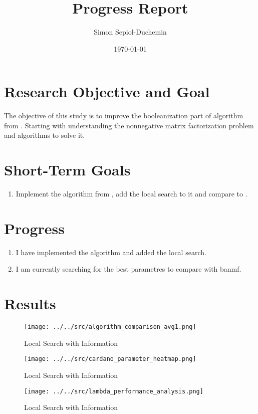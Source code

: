 \documentclass[a4paper,11pt]{article}
\title{Progress Report}
\author{Simon Sepiol-Duchemin}
\date{\today}
\begin{document}
%
\maketitle
\thispagestyle{empty}
%
\section{Research Objective and Goal}
The objective of this study is to improve the booleanization part of algorithm from \cite{9521203}. Starting with understanding the nonnegative matrix factorization problem and algorithms to solve it.
\section{Short-Term Goals}
\begin{enumerate}
\item Implement the algorithm from \cite{10541718}, add the local search to it and compare to \cite{9521203}.
\end{enumerate}
\section{Progress}
\begin{enumerate}
    \item I have implemented the algorithm and added the local search. 
    \item I am currently searching for the best parametres to compare with banmf.
\end{enumerate}

\section{Results}

\begin{figure}[H]
    \centering
    \texttt{[image: ../../src/algorithm\_comparison\_avg1.png]}
    \caption{Local Search with Information}
\end{figure}

\begin{figure}[H]
    \centering
    \texttt{[image: ../../src/cardano\_parameter\_heatmap.png]}
    \caption{Local Search with Information}
\end{figure}
\begin{figure}[H]
    \centering
    \texttt{[image: ../../src/lambda\_performance\_analysis.png]}
    \caption{Local Search with Information}
\end{figure}



\end{document}
